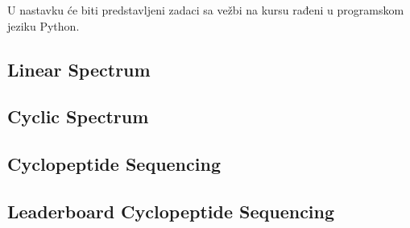 U nastavku će biti predstavljeni zadaci sa vežbi na kursu rađeni u programskom jeziku Python.

\subsection{Linear Spectrum}



\subsection{Cyclic Spectrum}



\subsection{Cyclopeptide Sequencing}



\subsection{Leaderboard Cyclopeptide Sequencing}

